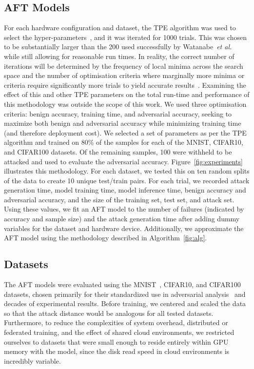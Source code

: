 \documentclass[conference]{IEEEtran}
\begin{document}
{\subsection{AFT Models}

For each hardware configuration and dataset, the TPE algorithm was used to select the hyper-parameters~\cite{ozaki2020multiobjective,zitzler2008quality}, and it was iterated for 1000 trials. This was chosen to be substantially larger than the 200 used successfully by Watanabe~\textit{et al.}~\cite{tpe_params} while still allowing for reasonable run times. In reality, the correct number of iterations will be determined by the frequency of local minima across the search space and the number of optimisation criteria where marginally more minima or criteria require significantly more trials to yield accurate results~\cite{legriel2010approximating}. Examining the effect of this and other TPE parameters on the total run-time and performance of this methodology was outside the scope of this work.
We used three optimisation criteria: benign accuracy, training time, and adversarial accuracy, seeking to maximize both benign and adversarial accuracy while minimizing training time (and therefore deployment cost). We selected a set of parameters as per the TPE algorithm and trained on 80\% of the samples for each of the MNIST, CIFAR10, and CIFAR100 datasets. Of the remaining samples, 100 were withheld to be attacked and used to evaluate the adversarial accuracy. Figure~\ref{fig:experiments} illustrates this methodology. For each dataset, we tested this on ten random splits of the data to create 10 unique test/train pairs. For each trial, we recorded attack generation time, model training time, model inference time, benign accuracy and adversarial accuracy, and the size of the training set, test set, and attack set. Using these values, we fit an AFT model to the number of failures (indicated by accuracy and sample size) and the attack generation time after adding dummy variables for the dataset and hardware device. Additionally, we approximate the AFT model using the methodology described in Algorithm~\ref{fig:alg}.


\subsection{Datasets}

The AFT models were evaluated using the MNIST~\cite{mnist}, CIFAR10\cite{cifar}, and CIFAR100\cite{cifar} datasets, chosen primarily for their standardized use in adversarial analysis~\cite{madry2017towards,croce_reliable_2020,carlini_towards_2017,deepfool} and decades of experimental results.
Before training, we centered and scaled the data so that the attack distance would be analogous for all tested datasets. Furthermore, to reduce the complexities of system overhead, distributed or federated training, and the effect of shared cloud environments, we restricted ourselves to datasets that were small enough to reside entirely within GPU memory with the model, since the disk read speed in cloud environments is incredibly variable.


}
\end{document}
